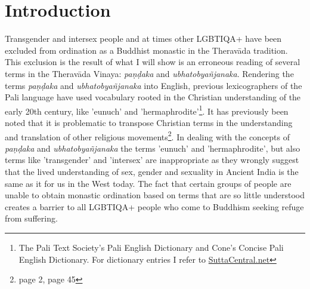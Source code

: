 \section{Introduction}
Transgender and intersex people and at times other LGBTIQA+ have been excluded from ordination as a Buddhist monastic in the Theravāda tradition. This exclusion is the result of what I will show is an erroneous reading of several terms in the Theravāda Vinaya: {\em paṇḍaka} and {\em ubhatob­yañ­janaka}. Rendering the terms {\em paṇḍaka} and {\em ubhatob­yañ­janaka} into English, previous lexicographers of the Pali language have used vocabulary rooted in the Christian understanding of the early 20th century, like 'eunuch' and 'hermaphrodite'\footnote{The Pali Text Society's Pali English Dictionary and Cone's Concise Pali English Dictionary. For dictionary entries I refer to \href{https://suttacentral.net/}{SuttaCentral.net}}. It has previously been noted that it is problematic to transpose Christian terms in the understanding and translation of other religious movements\footnote{\cite{maes} page 2, \cite{dudas} page 45}. In dealing with the concepts of {\em paṇḍaka} and {\em ubhatob­yañ­janaka} the terms 'eunuch' and 'hermaphrodite', but also terms like 'transgender' and 'intersex' are inappropriate as they wrongly suggest that the lived understanding of sex, gender and sexuality in Ancient India is the same as it for us in the West today. The fact that certain groups of people are unable to obtain monastic ordination based on terms that are so little understood creates a barrier to all LGBTIQA+ people who come to Buddhism seeking refuge from suffering.


